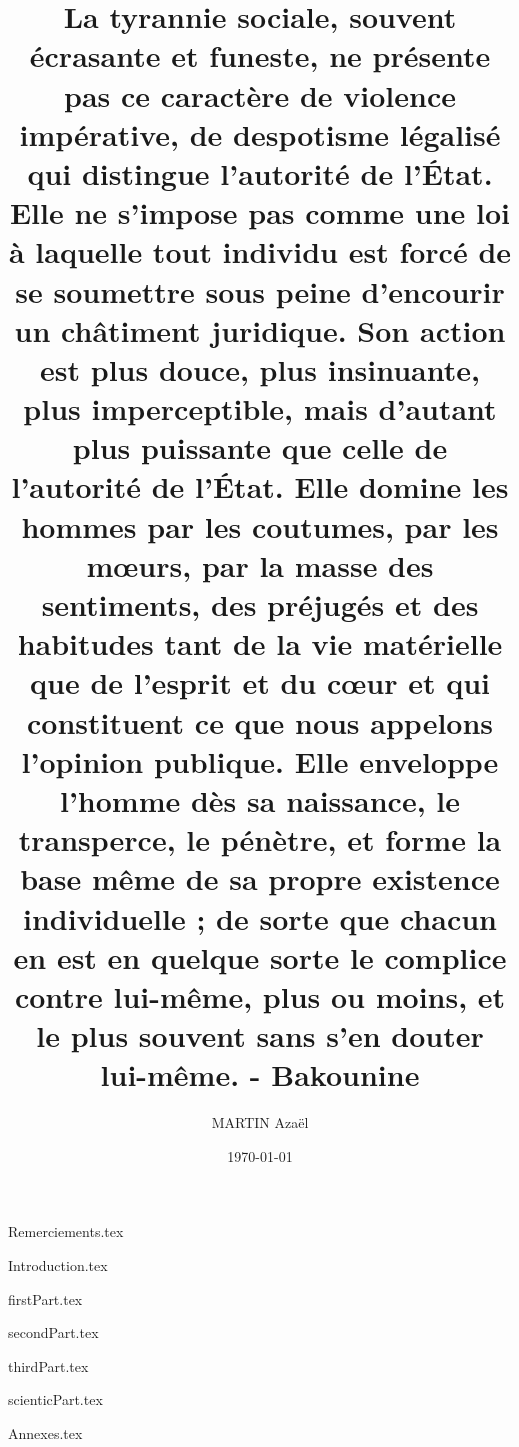 \documentclass{rUTT}
\title{La tyrannie sociale, souvent écrasante et funeste, ne présente pas ce caractère de violence impérative, de despotisme légalisé qui distingue l’autorité de l’État. Elle ne s’impose pas comme une loi à laquelle tout individu est forcé de se soumettre sous peine d’encourir un châtiment juridique. Son action est plus douce, plus insinuante, plus imperceptible, mais d’autant plus puissante que celle de l’autorité de l’État. Elle domine les hommes par les coutumes, par les mœurs, par la masse des sentiments, des préjugés et des habitudes tant de la vie matérielle que de l’esprit et du cœur et qui constituent ce que nous appelons l’opinion publique. Elle enveloppe l’homme dès sa naissance, le transperce, le pénètre, et forme la base même de sa propre existence individuelle ; de sorte que chacun en est en quelque sorte le complice contre lui-même, plus ou moins, et le plus souvent sans s’en douter lui-même. - Bakounine}
\date{\today}
\author{{\sc MARTIN} Azaël
}
\begin{document}
    \frontpageST %

    \myemptypage %

    \justify %

    {Remerciements.tex} %

    \clearpage




    \clearpage


    {Introduction.tex}

    \clearpage

    {firstPart.tex}

    \clearpage

    {secondPart.tex}

    \clearpage

    {thirdPart.tex}

    \clearpage

    {scienticPart.tex}

    \clearpage


    {Annexes.tex}

    \clearpage


    {
    \raggedright %
    \sloppy
    \nocite{*} %
    \printbibliography[title={Bibliographie},heading=bibintoc]

    \clearpage
    \listoffigures
    \listoftables
    }

    \clearpage
    \thispagestyle{empty}
    \setcounter{tocdepth}{10} %
    \tableofcontents

    \clearpage
    \myemptypage
\end{document}
